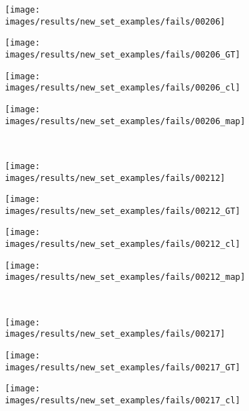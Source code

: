 \begin{figure}[t]
 \centering
 \begin{subfigure}[c]{0.24\textwidth}
  \centering
  \texttt{[image: images/results/new\_set\_examples/fails/00206]}
 \end{subfigure}
 \begin{subfigure}[c]{0.24\textwidth}
  \centering
  \texttt{[image: images/results/new\_set\_examples/fails/00206\_GT]}
 \end{subfigure}
 \begin{subfigure}[c]{0.24\textwidth}
  \centering
  \texttt{[image: images/results/new\_set\_examples/fails/00206\_cl]}
 \end{subfigure}
 \begin{subfigure}[c]{0.24\textwidth}
  \centering
  \texttt{[image: images/results/new\_set\_examples/fails/00206\_map]}
 \end{subfigure}
 \\
 \begin{subfigure}[c]{0.24\textwidth}
  \centering
  \texttt{[image: images/results/new\_set\_examples/fails/00212]}
 \end{subfigure}
 \begin{subfigure}[c]{0.24\textwidth}
  \centering
  \texttt{[image: images/results/new\_set\_examples/fails/00212\_GT]}
 \end{subfigure}
 \begin{subfigure}[c]{0.24\textwidth}
  \centering
  \texttt{[image: images/results/new\_set\_examples/fails/00212\_cl]}
 \end{subfigure}
 \begin{subfigure}[c]{0.24\textwidth}
  \centering
  \texttt{[image: images/results/new\_set\_examples/fails/00212\_map]}
 \end{subfigure}
 \\
 \begin{subfigure}[c]{0.24\textwidth}
  \centering
  \texttt{[image: images/results/new\_set\_examples/fails/00217]}
 \end{subfigure}
 \begin{subfigure}[c]{0.24\textwidth}
  \centering
  \texttt{[image: images/results/new\_set\_examples/fails/00217\_GT]}
 \end{subfigure}
 \begin{subfigure}[c]{0.24\textwidth}
  \centering
  \texttt{[image: images/results/new\_set\_examples/fails/00217\_cl]}

\end{subfigure}
\end{figure}
